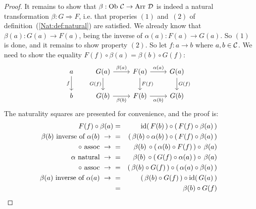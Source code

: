 \begin{proof}
    It remains to show that $\beta:\mbox{\rm Ob}\ \mbox{$\cal C$}\to\mbox{\rm Arr}\ \mbox{$\cal D$}$ is indeed
    a natural transformation $\beta:G\Rightarrow F$, i.e. that properies 
    $(1)$ and~$(2)$ of definition~(\ref{Nat:def:natural}) are satisfied. 
    We already know that $\beta(a):G(a)\to F(a)$, being the inverse
    of $\alpha(a):F(a)\to G(a)$. So $(1)$ is done, and it remains to
    show property $(2)$. So let $f:a\to b$ where $a,b\in\mbox{$\cal C$}$.
    We need to show the equality $F(f)\circ\beta(a)=\beta(b)\circ G(f)$:
    \[
        \begin{tikzcd}
            a\arrow[d,swap, "f"]
            &G(a)\arrow[r, "\beta(a)"]\arrow[d, swap,"G(f)"]
            &F(a)\arrow[r,"\alpha(a)"]\arrow[d, "F(f)"]
            &G(a)\arrow[d, "G(f)"]
            \\
            b
            &G(b)\arrow[r, swap, "\beta(b)"]
            &F(b)\arrow[r, swap, "\alpha(b)"]
            &G(b)
        \end{tikzcd}
    \]
    The naturality squares are presented for convenience, and the proof is:
    \begin{eqnarray*}F(f)\circ\beta(a)
        &=&\id(\,F(b)\,)\circ (\,F(f)\circ\beta(a)\,)\\
        \mbox{$\beta(b)$ inverse of $\alpha(b)$}\ \to\ 
        &=&(\,\beta(b)\circ\alpha(b)\,)\circ(\,F(f)\circ\beta(a)\,)\\
        \mbox{$\circ$ assoc}\ \to\ 
        &=&\beta(b)\,\circ(\,\alpha(b)\circ F(f)\,)\circ\,\beta(a)\\
        \mbox{$\alpha$ natural}\ \to\ 
        &=&\beta(b)\,\circ(\,G(f)\circ \alpha(a)\,)\circ\,\beta(a)\\
        \mbox{$\circ$ assoc}\ \to\ 
        &=&(\,\beta(b)\circ G(f)\,)\circ(\,\alpha(a)\circ\beta(a)\,)\\
        \mbox{$\beta(a)$ inverse of $\alpha(a)$}\ \to\ 
        &=&(\,\beta(b)\circ G(f)\,)\circ\id(\,G(a)\,)\\
        &=&\beta(b)\circ G(f)
    \end{eqnarray*}
\end{proof}

